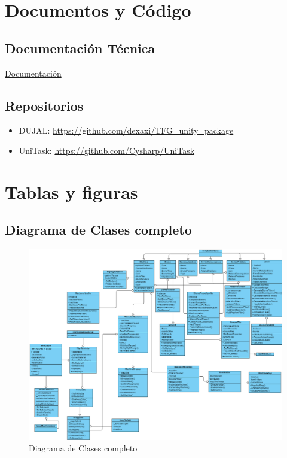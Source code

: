 \section{Documentos y Código}
\subsection{Documentación Técnica}

\href{https://github.com/dexaxi/RecursosSolarcore/blob/main/Assets/Documentation/Memoria%20-%20%C3%81ngel/tfg-template-master/EcoRescue.pdf}{Documentación}

\subsection{Repositorios}
\begin{itemize}
  \item DUJAL: \url{https://github.com/dexaxi/TFG_unity_package}
  \item UniTask: \url{https://github.com/Cysharp/UniTask}
\end{itemize}

\section{Tablas y figuras}

\subsection{Diagrama de Clases completo}

\begin{figure}[H]
  \centering
  \includegraphics[width=450px,clip=true]{Logic_Class_Diagram.png}
  \caption{Diagrama de Clases completo}
  \label{fig:logicUML}
\end{figure}
\raggedbottom


